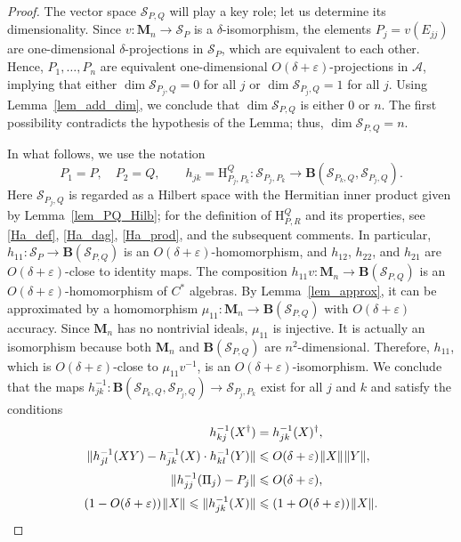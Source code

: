\documentclass[12pt]{article}
\newcommand{\CC}{\mathbb{C}}
\newcommand{\calA}{\mathcal{A}}
\newcommand{\calS}{\mathcal{S}}
\newcommand{\ts}{\mkern1mu}
\newcommand{\Bo}{\mathbf{B}}
\newcommand{\Ha}{\mathrm{H}}
\newcommand{\wt}{\widetilde}
\newcommand*{\Ma}[1]{\mathbf{M}_{#1}}
\newcommand{\eps}{\varepsilon}
\renewcommand{\le}{\leqslant}
\newtheorem[definition]{Definition}[Theorem]{Definition}
\newtheorem[remark]{Example}[Theorem]{Example}
\newtheorem[remark]{Remark}[Theorem]{Remark}
\newtheorem[remark]{Question}[Theorem]{Open question}
\newtheorem*[definition]{definition}{Definition}
\newtheorem*[remark]{example}{Example}
\newtheorem*[remark]{remark}{Remark}
\newtheorem*[remark]{question}{Open question}
\numberwithin{equation}{section}
\begin{document}
\begin{proof}
The vector space $\calS_{P,Q}$ will play a key role; let us determine its dimensionality. Since $v\colon \Ma{n}\to\calS_{P}$ is a $\delta$-isomorphism, the elements $P_j=v(E_{jj})$ are one-dimensional $\delta$-projections in $\calS_P$, which are equivalent to each other. Hence, $P_1,\dots,P_n$ are equivalent one-dimensional $O(\delta+\eps)$-projections in $\calA$, implying that either $\dim\calS_{P_j,Q}=0$ for all $j$ or $\dim\calS_{P_j,Q}=1$ for all $j$. Using Lemma~\ref{lem_add_dim}, we conclude that $\dim\calS_{P,Q}$ is either $0$ or $n$. The first possibility contradicts the hypothesis of the Lemma; thus, $\dim\calS_{P,Q}=n$.

In what follows, we use the notation
\begin{equation}
P_1=P,\quad P_2=Q,\qquad
h_{jk}=\Ha^{Q}_{P_j,P_k}\colon\calS_{P_j,P_k}\to\Bo(\calS_{P_k,Q},\calS_{P_j,Q}).
\end{equation}
Here $\calS_{P_j,Q}$ is regarded as a Hilbert space with the Hermitian inner product given by Lemma~\ref{lem_PQ_Hilb}; for the definition of $\Ha^{Q}_{P,R}$ and its properties, see \eqref{Ha_def}, \eqref{Ha_dag}, \eqref{Ha_prod}, and the subsequent comments. In particular, $h_{11}\colon\calS_{P}\to\Bo(\calS_{P,Q})$ is an $O(\delta+\eps)$-homomorphism, and $h_{12}$, $h_{22}$, and $h_{21}$ are $O(\delta+\eps)$-close to identity maps. The composition $h_{11}v\colon\Ma{n}\to \Bo(\calS_{P,Q})$ is an $O(\delta+\eps)$-homomorphism of $C^*$ algebras. By Lemma~\ref{lem_approx}, it can be approximated by a homomorphism $\mu_{11}\colon\Ma{n}\to \Bo(\calS_{P,Q})$ with $O(\delta+\eps)$ accuracy. Since $\Ma{n}$ has no nontrivial ideals, $\mu_{11}$ is injective. It is actually an isomorphism because both $\Ma{n}$ and $\Bo(\calS_{P,Q})$ are $n^2$-dimensional. Therefore, $h_{11}$, which is $O(\delta+\eps)$-close to $\mu_{11}v^{-1}$, is an $O(\delta+\eps)$-isomorphism. We conclude that the maps $h_{jk}^{-1}\colon\Bo(\calS_{P_k,Q},\calS_{P_j,Q})\to\calS_{P_j,P_k}$ exist for all $j$ and $k$ and satisfy the conditions
\begin{align}
\label{merging0h}
h_{kj}^{-1}(X^\dag)&=h^{-1}_{jk}(X)^\dag,\\[2pt]
\label{merging1h}
\|h^{-1}_{jl}(XY)-h^{-1}_{jk}(X)\cdot h^{-1}_{kl}(Y)\|
&\le O(\delta+\eps)\ts\|X\|\ts\|Y\|,\\[2pt]
\label{merging2h}
\|h^{-1}_{jj}(\Pi_j)-P_j\|&\le O(\delta+\eps),\\[2pt]
\label{merging3h}
(1-O(\delta+\eps))\ts\|X\|\le\|h^{-1}_{jk}(X)\| &\le(1+O(\delta+\eps))\ts\|X\|.
\end{align}


\end{proof}
\end{document}
